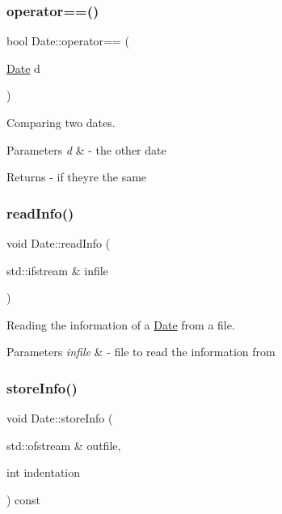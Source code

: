 \subsubsection{\texorpdfstring{operator==()}{operator==()}}
{\footnotesize\ttfamily bool Date\+::operator== (\begin{DoxyParamCaption}\item[{\mbox{\hyperlink{class_date}{Date}}}]{d }\end{DoxyParamCaption})}



Comparing two dates. 


\begin{DoxyParams}{Parameters}
{\em d} & -\/ the other date \\
\hline
\end{DoxyParams}
\begin{DoxyReturn}{Returns}
-\/ if they\textquotesingle{}re the same 
\end{DoxyReturn}
\mbox{\label{class_date_ad23dffa000ed62018a399c519acb06db}} 
\subsubsection{\texorpdfstring{read\+Info()}{readInfo()}}
{\footnotesize\ttfamily void Date\+::read\+Info (\begin{DoxyParamCaption}\item[{std\+::ifstream \&}]{infile }\end{DoxyParamCaption})}



Reading the information of a \mbox{\hyperlink{class_date}{Date}} from a file. 


\begin{DoxyParams}{Parameters}
{\em infile} & -\/ file to read the information from \\
\hline
\end{DoxyParams}
\mbox{\label{class_date_a979593888deb70d07fd12f8f869a109c}} 
\subsubsection{\texorpdfstring{store\+Info()}{storeInfo()}}
{\footnotesize\ttfamily void Date\+::store\+Info (\begin{DoxyParamCaption}\item[{std\+::ofstream \&}]{outfile,  }\item[{int}]{indentation }\end{DoxyParamCaption}) const}



